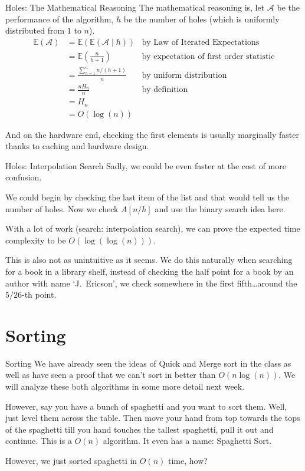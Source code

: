 \documentclass[9pt]{beamer}
\begin{document}
\begin{frame}{Holes: The Mathematical Reasoning}
The mathematical reasoning is, let $\mathcal{A}$ be the performance of the algorithm, $h$ be the number of holes (which is uniformly distributed from $1$ to $n$).
\begin{align*}
\mathbb{E}(\mathcal{A}) &= \mathbb{E}(\mathbb{E}(\mathcal{A} \mid h)) & \text{by Law of Iterated Expectations} \\
&= \mathbb{E}\left(\frac{n}{h+1}\right) & \text{by expectation of first order statistic} \\
&= \frac{\sum_{h=1}^{n} n/(h+1)}{n} & \text{by uniform distribution} \\
&= \frac{n H_n}{n} & \text{by definition} \\
&= H_n \\
&= O(\log(n))
\end{align*}

And on the hardware end, checking the first elements is usually marginally faster thanks to caching and hardware design.
\end{frame}

\begin{frame}{Holes: Interpolation Search}
Sadly, we could be even faster at the cost of more confusion.

We could begin by checking the last item of the list and that would tell us the number of holes. Now we check $A[n/h]$ and use the binary search idea here.

With a lot of work (search: interpolation search), we can prove the expected time complexity to be $O(\log(\log(n)))$.

This is also not as unintuitive as it seems. We do this naturally when searching for a book in a library shelf, instead of checking the half point for a book by an author with name `J.\ Ericson', we check somewhere in the first fifth\ldots around the $5/26$-th point.
\end{frame}

\section{Sorting}

\begin{frame}{Sorting}
We have already seen the ideas of Quick and Merge sort in the class as well as have seen a proof that we can't sort in better than $O(n\log(n))$. We will analyze these both algorithms in some more detail next week.

However, say you have a bunch of spaghetti and you want to sort them. Well, just level them across the table. Then move your hand from top towards the tops of the spaghetti till you hand touches the tallest spaghetti, pull it out and continue. This is a $O(n)$ algorithm. It even has a name: Spaghetti Sort.

However, we just sorted spaghetti in $O(n)$ time, how?
\end{frame}
\end{document}
